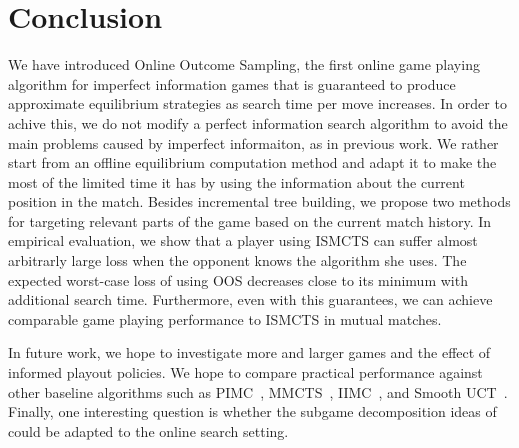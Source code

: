 \documentclass{aamas2015}
\newcounter{mlNoteCounter}
\newcommand{\mlnote}[1]{{\scriptsize \color{darkgreen} $\blacksquare$ \refstepcounter{mlNoteCounter}\textsf{[ML]$_{\arabic{mlNoteCounter}}$:{#1}}}}
\renewcommand{\mlnote}[1]{}
\begin{document}



\section{Conclusion}

\mlnote{Still needs expanding.}
We have introduced Online Outcome Sampling, the first online game playing algorithm for imperfect information games that is guaranteed to produce  
approximate equilibrium strategies as search time per move increases.
In order to achive this, we do not modify a perfect information search algorithm to avoid the main problems caused by imperfect informaiton, as in previous work.
We rather start from an offline equilibrium computation method and adapt it to make the most of the limited time it has by using the information about the current position in the match.
Besides incremental tree building, we propose two methods for targeting relevant parts of the game based on the current match history.
In empirical evaluation, we show that a player using ISMCTS can suffer almost arbitrarly large loss when the opponent knows the algorithm she uses. 
The expected worst-case loss of using OOS decreases close to its minimum with additional search time.
Furthermore, even with this guarantees, we can achieve comparable game playing performance to ISMCTS in mutual matches.

In future work, we hope to investigate more and larger games and the effect of informed playout policies. 
We hope to compare practical performance against other baseline algorithms such as 
PIMC~\cite{Long10Understanding}, MMCTS~\cite{Auger11Multiple}, IIMC~\cite{Furtak13Recursive}, and Smooth UCT~\cite{Heinrich14}.
Finally, one interesting question is whether the subgame decomposition ideas of~\cite{Burch14Solving,Jackson14} could be 
adapted to the online search setting. 
\end{document}
